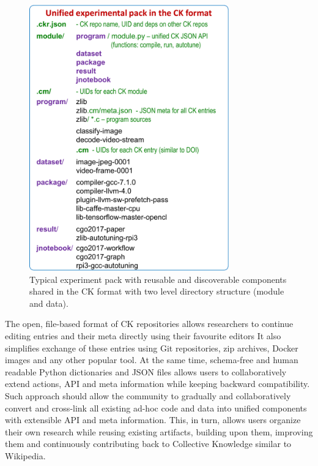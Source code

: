    \begin{figure}[htbp]
     \centering
      \includegraphics[width=3.4in]
      {ck-assets/57ab625c176c52ad-cropped.pdf} %
     \caption{
        Typical experiment pack with reusable and discoverable components 
        shared in the CK format with two level directory structure (module and data).
     }
     \label{fig:ck-repo}
   \end{figure}

The open, file-based format of CK repositories allows researchers
to continue editing entries and their meta directly using their favourite editors
%
It also simplifies exchange of these entries using Git repositories, zip archives, Docker images 
and any other popular tool.
%
At the same time, schema-free and human readable Python dictionaries
and JSON files allows users to collaboratively extend actions, API and meta information
while keeping backward compatibility.
%
Such approach should allow the community to gradually and collaboratively convert and
cross-link all existing ad-hoc code and data into unified components
with extensible API and meta information.
%
This, in turn, allows users organize their own research while reusing existing artifacts,
building upon them, improving them and continuously contributing back to Collective Knowledge
similar to Wikipedia.

